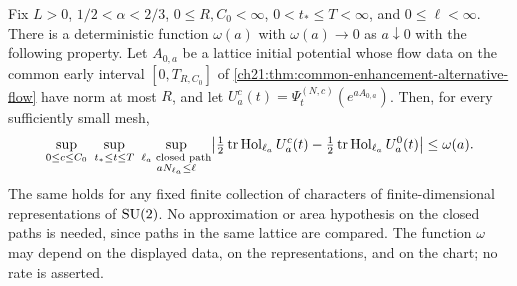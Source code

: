 \begin{lemma}\label{ch22:lem:alternative-uniform-handoff}
Fix $L>0$, $1/2<\alpha<2/3$, $0\le R,C_0<\infty$, $0<t_*\le T<\infty$, and $0\le\ell<\infty$. There is a deterministic function $\omega(a)$ with $\omega(a)\to0$ as $a\downarrow0$ with the following property. Let $A_{0,a}$ be a lattice initial potential whose flow data on the common early interval $[0,T_{R,C_0}]$ of \cref{ch21:thm:common-enhancement-alternative-flow} have norm at most $R$, and let $U_a^c(t)=\Psi_t^{(N,c)}(e^{aA_{0,a}})$. Then, for every sufficiently small mesh,
\begin{equation}\label{ch22:eq:alternative-uniform-loops}
 \sup_{0\le c\le C_0}\ \sup_{t_*\le t\le T}\ \sup_{\substack{\ell_a\text{ closed path}\\ aN_{\ell_a}\le\ell}}
 \bigl|\tfrac12\operatorname{tr}\operatorname{Hol}_{\ell_a}U_a^c(t)-\tfrac12\operatorname{tr}\operatorname{Hol}_{\ell_a}U_a^0(t)\bigr|\le\omega(a).
\end{equation}
The same holds for any fixed finite collection of characters of finite-dimensional representations of $\mathrm{SU}(2)$. No approximation or area hypothesis on the closed paths is needed, since paths in the same lattice are compared. The function $\omega$ may depend on the displayed data, on the representations, and on the chart; no rate is asserted.
\end{lemma}

